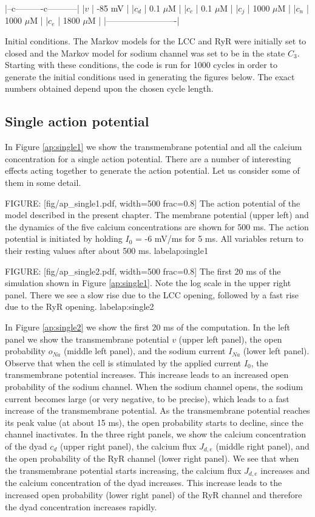 |--c----------c-----------|
|$v$     | -85 mV         |
|$c_{d}$ | 0.1 $\mu$M     |
|$c_{c}$ | 0.1 $\mu$M     |
|$c_{j}$ | 1000 $\mu$M    |
|$c_{n}$ | 1000 $\mu$M    |
|$c_{e}$ | 1800 $\mu$M    |
|-------------------------|

Initial conditions. The Markov models for the LCC and RyR were initially set to closed and the Markov model for sodium channel was set to be in the state $C_3$. Starting with these conditions, the code is run for 1000 cycles in order to generate the initial conditions used in generating the figures below. The exact numbers obtained depend upon the chosen cycle length. \label{tab:init}






\subsection{Single action potential}

In Figure \ref{ap:single1} we show the transmembrane potential and all the calcium concentration for a single action potential. There are a number of interesting effects acting together to generate the action potential. Let us consider some of them in some detail.

FIGURE: [fig/ap_single1.pdf, width=500 frac=0.8] The action potential of the model described in the present chapter. The membrane potential (upper left) and the dynamics of the five calcium concentrations are shown for 500 ms. The action potential is initiated by holding $I_0$ = -6 mV/ms for 5 ms. All variables return to their resting values after about 500 ms.  label{ap:single1}

FIGURE: [fig/ap_single2.pdf, width=500 frac=0.8] The first 20 ms of the simulation shown in Figure \ref{ap:single1}. Note the log scale in the upper right panel. There we see a slow rise due to the LCC opening, followed by a fast rise due to the RyR opening. label{ap:single2}

In Figure \ref{ap:single2} we show the first 20 ms of the computation. In the left panel we show the transmembrane potential $v$ (upper left panel), the open probability $o_{Na}$ (middle left panel), and the sodium current $I_{Na}$ (lower left panel). Observe that when the cell is stimulated by the applied current $I_0$, the transmembrane potential increases. This increase leads to an increased open probability of the sodium channel. When the sodium channel opens, the sodium current becomes large (or very negative, to be precise), which leads to a fast increase of the transmembrane potential. As the transmembrane potential reaches its peak value (at about 15 ms), the open probability starts to decline, since the channel inactivates. In the three right panels, we show the calcium concentration of the dyad $c_d$ (upper right panel), the calcium flux $J_{d,e}$ (middle right panel), and the open probability of the RyR channel  (lower right panel). We see that when the transmembrane potential starts increasing, the calcium flux $J_{d,e}$ increases and the calcium concentration of the dyad increases. This increase leads to the increased open probability (lower right panel) of the RyR channel and therefore the dyad concentration increases rapidly.

